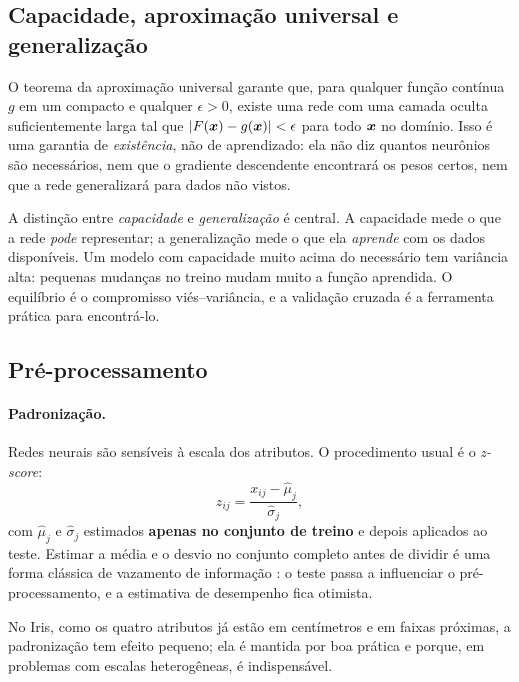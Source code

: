 \subsection{Capacidade, aproximação universal e generalização}
\label{sec:universal}

O teorema da aproximação universal \cite{cybenko1989,hornik1989} garante que, para qualquer função
contínua $g$ em um compacto e qualquer $\epsilon>0$, existe uma rede com uma camada oculta
suficientemente larga tal que $|F(\bm{x})-g(\bm{x})|<\epsilon$ para todo $\bm{x}$ no domínio. Isso é uma
garantia de \emph{existência}, não de aprendizado: ela não diz quantos neurônios são necessários,
nem que o gradiente descendente encontrará os pesos certos, nem que a rede generalizará para
dados não vistos.

A distinção entre \emph{capacidade} e \emph{generalização} é central. A capacidade mede o que a
rede \emph{pode} representar; a generalização mede o que ela \emph{aprende} com os dados
disponíveis. Um modelo com capacidade muito acima do necessário tem variância alta: pequenas
mudanças no treino mudam muito a função aprendida. O equilíbrio é o compromisso
viés--variância, e a validação cruzada é a ferramenta prática para encontrá-lo.

\subsection{Pré-processamento}
\label{sec:preproc}

\paragraph{Padronização.} Redes neurais são sensíveis à escala dos atributos. O procedimento
usual é o \emph{z-score}:
\begin{equation}
	z_{ij} = \frac{x_{ij} - \hat{\mu}_j}{\hat{\sigma}_j},
	\label{eq:zscore}
\end{equation}
com $\hat{\mu}_j$ e $\hat{\sigma}_j$ estimados \textbf{apenas no conjunto de treino} e depois
aplicados ao teste. Estimar a média e o desvio no conjunto completo antes de dividir é uma forma
clássica de vazamento de informação \cite{kaufman2012}: o teste passa a influenciar o
pré-processamento, e a estimativa de desempenho fica otimista.

No Iris, como os quatro atributos já estão em centímetros e em faixas próximas, a padronização
tem efeito pequeno; ela é mantida por boa prática e porque, em problemas com escalas
heterogêneas, é indispensável.

